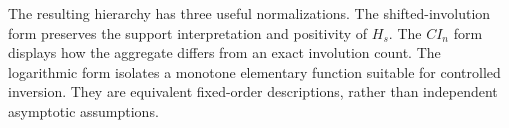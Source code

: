The resulting hierarchy has three useful normalizations. The shifted-involution form preserves the support interpretation and positivity of $H_s$. The $CI_n$ form displays how the aggregate differs from an exact involution count. The logarithmic form isolates a monotone elementary function suitable for controlled inversion. They are equivalent fixed-order descriptions, rather than independent asymptotic assumptions.
